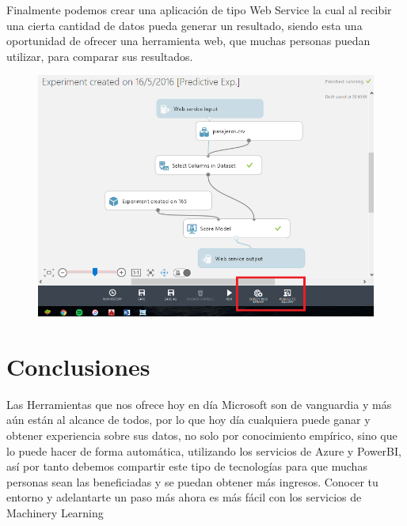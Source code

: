 \documentclass[11pt]{article}
\begin{document}
Finalmente podemos crear una aplicación de tipo Web Service la cual al recibir una cierta cantidad de datos pueda generar un resultado, siendo esta una oportunidad de ofrecer una herramienta web, que muchas personas puedan utilizar, para comparar sus resultados.

\begin{figure}[htp]
\centering
\includegraphics[width=12cm]{10.jpg}
\label{fig:lion}
\end{figure}




\newpage
\section {Conclusiones }

Las Herramientas que nos ofrece hoy en día Microsoft son de vanguardia y más aún están al alcance de todos, por lo que hoy día cualquiera puede ganar y obtener experiencia sobre sus datos, no solo por conocimiento empírico, sino que lo puede hacer de forma automática, utilizando los servicios de Azure y PowerBI, así por tanto debemos compartir este tipo de tecnologías para que muchas personas sean las beneficiadas y se puedan obtener más ingresos. Conocer tu entorno y adelantarte un paso más ahora es más fácil con los servicios de Machinery Learning
\end{document}
